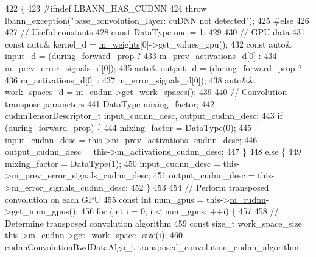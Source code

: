 \begin{DoxyCode}
422                                                                     \{
423 \textcolor{preprocessor}{  #ifndef LBANN\_HAS\_CUDNN}
424     \textcolor{keywordflow}{throw} lbann\_exception(\textcolor{stringliteral}{"base\_convolution\_layer: cuDNN not detected"});
425 \textcolor{preprocessor}{  #else}
426 
427     \textcolor{comment}{// Useful constants}
428     \textcolor{keyword}{const} DataType one = 1;
429 
430     \textcolor{comment}{// GPU data}
431     \textcolor{keyword}{const} \textcolor{keyword}{auto}& kernel\_d = \hyperlink{classlbann_1_1Layer_a7954e30fbf9100a6ba4b56d02767a469}{m\_weights}[0]->get\_values\_gpu();
432     \textcolor{keyword}{const} \textcolor{keyword}{auto}& input\_d = (during\_forward\_prop ?
433                            m\_prev\_activations\_d[0] :
434                            m\_prev\_error\_signals\_d[0]);
435     \textcolor{keyword}{auto}& output\_d = (during\_forward\_prop ?
436                       m\_activations\_d[0] :
437                       m\_error\_signals\_d[0]);
438     \textcolor{keyword}{auto}&& work\_spaces\_d = \hyperlink{classlbann_1_1Layer_a08dbb94239e3b8c96329786c57c72e21}{m\_cudnn}->get\_work\_spaces();
439 
440     \textcolor{comment}{// Convolution transpose parameters}
441     DataType mixing\_factor;
442     cudnnTensorDescriptor\_t input\_cudnn\_desc, output\_cudnn\_desc;
443     \textcolor{keywordflow}{if} (during\_forward\_prop) \{
444       mixing\_factor = DataType(0);
445       input\_cudnn\_desc = this->m\_prev\_activations\_cudnn\_desc;
446       output\_cudnn\_desc = this->m\_activations\_cudnn\_desc;
447     \}
448     \textcolor{keywordflow}{else} \{
449       mixing\_factor = DataType(1);
450       input\_cudnn\_desc = this->m\_prev\_error\_signals\_cudnn\_desc;
451       output\_cudnn\_desc = this->m\_error\_signals\_cudnn\_desc;
452     \}
453 
454     \textcolor{comment}{// Perform transposed convolution on each GPU}
455     \textcolor{keyword}{const} \textcolor{keywordtype}{int} num\_gpus = this->\hyperlink{classlbann_1_1Layer_a08dbb94239e3b8c96329786c57c72e21}{m\_cudnn}->get\_num\_gpus();
456     \textcolor{keywordflow}{for} (\textcolor{keywordtype}{int} i = 0; i < num\_gpus; ++i) \{
457 
458       \textcolor{comment}{// Determine transposed convolution algorithm}
459       \textcolor{keyword}{const} \textcolor{keywordtype}{size\_t} work\_space\_size = this->\hyperlink{classlbann_1_1Layer_a08dbb94239e3b8c96329786c57c72e21}{m\_cudnn}->get\_work\_space\_size(i);
460       cudnnConvolutionBwdDataAlgo\_t transposed\_convolution\_cudnn\_algorithm

\end{DoxyCode}
